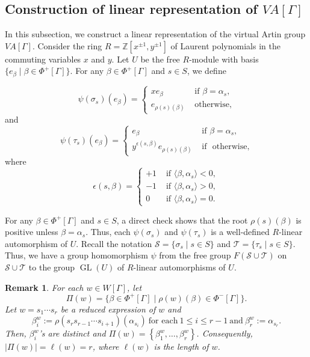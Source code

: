 \documentclass[12pt]{amsart}
\newtheorem{remark}[equation]{Remark}
\numberwithin{equation}{section}
\newcommand{\GL}{\operatorname{GL}}
\begin{document}
\subsection{Construction of linear representation of $VA[\Gamma]$} 
In this subsection, we construct a linear representation of the virtual Artin group $VA[\Gamma]$. Consider the ring $R=\mathbb Z [x^{\pm 1}, y^{\pm 1}]$ of Laurent polynomials in the commuting variables $x$ and $y$. Let $U$ be the free $R$-module with basis $\{e_\beta  \mid \beta \in \Phi^{+}[\Gamma] \}$. For any $\beta \in \Phi^{+}[\Gamma]$ and $s \in S$, we define


$$
\psi\left(\sigma_s\right)\left(e_\beta\right)= \begin{cases}
x e_\beta  & \text{ if } \beta=\alpha_s, \\ 
e_{\rho(s)(\beta)} & \text{ otherwise,}
 \end{cases}
$$
and
$$
\psi\left(\tau_{s}\right)\left(e_\beta\right)= \begin{cases}
e_{\beta} & \text{ if } \beta=\alpha_s,  \\ 
y^{\epsilon(s,\beta)} e_{\rho(s)(\beta)}  & \text{ if } \text{ otherwise,} \end{cases}
$$
where $$\epsilon(s,\beta)= \begin{cases}
+1  & \text{ if } \langle \beta , \alpha_s \rangle < 0,  \\ 
-1 & \text{ if } \langle \beta , \alpha_s \rangle > 0, \\
0  & \text{ if } \langle \beta , \alpha_s \rangle =0
 .\end{cases}
$$ 

For any $\beta \in \Phi^{+}[\Gamma]$ and $s \in S$, a direct check shows that the root $\rho(s)(\beta)$ is positive unless $\beta=\alpha_s$. Thus, each $\psi(\sigma_s)$ and $\psi(\tau_s)$ is a well-defined $R$-linear automorphism of $U$. Recall the notation $\mathcal{S} =\{\sigma_s \mid s \in S\}$ and $\mathcal{T}= \{\tau_s \mid s \in S\}$. Thus, we have a group homomorphism  $\psi$ from the free group $F(\mathcal{S} \cup \mathcal{T})$ on $\mathcal{S} \cup \mathcal{T}$ to the group $\GL(U)$ of $R$-linear automorphisms of $U$.

\begin{remark}\label{rmk:pi(w)}
For each $w \in W[\Gamma]$, let 
$$\Pi(w)= \{\beta \in \Phi^+[\Gamma] \mid  \rho(w)(\beta) \in \Phi^-[\Gamma] \}.$$
Let $w=s_1 \cdots s_r$ be a  reduced expression of $w$ and 
$$
\beta^w_i:=\rho(s_r s_{r-1} \cdots s_{i+1})\left(\alpha_{s_i}\right)~\textrm{for each}~1 \le i \le r-1~\textrm{and}~ \beta^w_r:=\alpha_{s_r}.
$$
 Then,  $\beta^w_i$'s are distinct and $\Pi(w)=\left\{\beta^w_1, \ldots, \beta^w_r\right\}$. Consequently, $|\Pi(w)|= \ell(w)=r$, where $\ell(w)$ is the length of $w$.
\end{remark}
\end{document}
